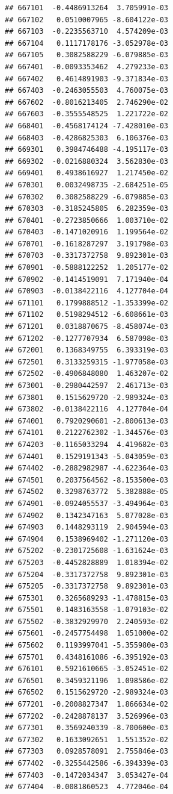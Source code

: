 \begin{frame}[fragile]
\begin{verbatim}
## 667101  -0.4486913264  3.705991e-03
## 667102   0.0510007965 -8.604122e-03
## 667103  -0.2235563710  4.574209e-03
## 667104   0.1117178176 -3.052978e-03
## 667105   0.3082588229 -6.079885e-03
## 667401  -0.0093353462  4.279233e-03
## 667402   0.4614891903 -9.371834e-03
## 667403  -0.2463055503  4.760075e-03
## 667602  -0.8016213405  2.746290e-02
## 667603  -0.3555548525  1.221722e-02
## 668401  -0.4568174124 -7.428010e-03
## 668403  -0.4286825303  6.106376e-03
## 669301   0.3984746488 -4.195117e-03
## 669302  -0.0216880324  3.562830e-03
## 669401   0.4938616927  1.217450e-02
## 670301   0.0032498735 -2.684251e-05
## 670302   0.3082588229 -6.079885e-03
## 670303  -0.3185245805  6.282359e-03
## 670401  -0.2723850666  1.003710e-02
## 670403  -0.1471020916  1.199564e-02
## 670701  -0.1618287297  3.191798e-03
## 670703  -0.3317372758  9.892301e-03
## 670901  -0.5888122252  1.205177e-02
## 670902  -0.1414519091  7.171940e-04
## 670903  -0.0138422116  4.127704e-04
## 671101   0.1799888512 -1.353399e-02
## 671102   0.5198294512 -6.608661e-03
## 671201   0.0318870675 -8.458074e-03
## 671202  -0.1277707934  6.587098e-03
## 672001   0.1368349755  6.393319e-03
## 672501   0.3133259315 -1.977058e-03
## 672502  -0.4906848080  1.463207e-02
## 673001  -0.2980442597  2.461713e-03
## 673801   0.1515629720 -2.989324e-03
## 673802  -0.0138422116  4.127704e-04
## 674001   0.7920290601 -2.800613e-03
## 674101   0.2122762302 -1.344576e-03
## 674203  -0.1165033294  4.419682e-03
## 674401   0.1529191343 -5.043059e-03
## 674402  -0.2882982987 -4.622364e-03
## 674501   0.2037564562 -8.153500e-03
## 674502   0.3298763772  5.382888e-05
## 674901  -0.0924055537 -3.494964e-03
## 674902   0.1342347163  5.077028e-03
## 674903   0.1448293119  2.904594e-03
## 674904   0.1538969402 -1.271120e-03
## 675202  -0.2301725608 -1.631624e-03
## 675203  -0.4452828889  1.018394e-02
## 675204  -0.3317372758  9.892301e-03
## 675205  -0.3317372758  9.892301e-03
## 675301   0.3265689293 -1.478815e-03
## 675501   0.1483163558 -1.079103e-02
## 675502  -0.3832929970  2.240593e-02
## 675601  -0.2457754498  1.051000e-02
## 675602   0.1193997041 -5.355980e-03
## 675701   0.4348161086 -6.395192e-03
## 676101   0.5921610665 -3.052451e-02
## 676501   0.3459321196  1.098586e-02
## 676502   0.1515629720 -2.989324e-03
## 677201  -0.2008827347  1.866634e-02
## 677202  -0.2428878137  3.526996e-03
## 677301   0.3569240339 -8.700600e-03
## 677302   0.1633092651  1.551352e-02
## 677303   0.0928578091  2.755846e-03
## 677402  -0.3255442586 -6.394339e-03
## 677403  -0.1472034347  3.053427e-04
## 677404  -0.0081860523  4.772046e-04

\end{verbatim}
\end{frame}
